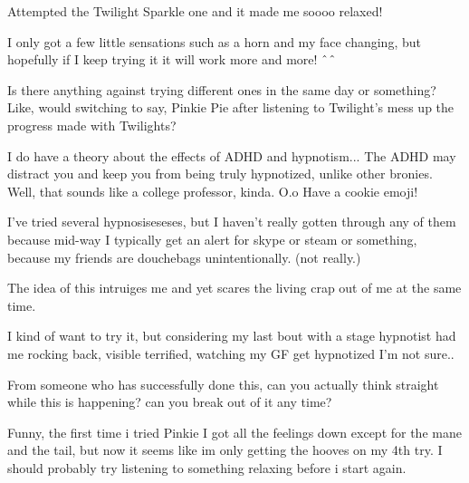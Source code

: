 \documentclass[ebook,12pt,oneside,openany]{memoir}
\newcommand{\carat}{$\char`\^$}
\begin{document}
\begin{tcolorbox}[title=Miss H]
\par{Attempted the Twilight Sparkle one and it made me soooo relaxed!}
\par{I only got a few little sensations such as a horn and my face changing, but hopefully if I keep trying it it will work more and more! \carat{}\carat{}}
\newline{}
\par{Is there anything against trying different ones in the same day or something? Like, would switching to say, Pinkie Pie after listening to Twilight's mess up the progress made with Twilights?}
\end{tcolorbox}
\begin{tcolorbox}[title=Scarletthealicorn,colback=lime!5!white,colframe=lime!75!black,coltitle=white]
\par{I do have a theory about the effects of ADHD and hypnotism... The ADHD may distract you and keep you from being truly hypnotized, unlike other bronies. Well, that sounds like a college professor, kinda. O.o   Have a cookie emoji!}
\end{tcolorbox}
\begin{tcolorbox}[title=Ron J]
\par{I've tried several hypnosiseseses, but I haven't really gotten through any of them because mid-way I typically get an alert for skype or steam or something, because my friends are douchebags unintentionally. (not really.)}
\end{tcolorbox}
\begin{tcolorbox}[title=Quiles]
\par{The idea of this intruiges me and yet scares the living crap out of me at the same time.}
\par{I kind of want to try it, but considering my last bout with a stage hypnotist had me rocking back, visible terrified, watching my GF get hypnotized I'm not sure..}
\newline{}
\par{From someone who has successfully done this, can you actually think straight while this is happening? can you break out of it any time?}
\end{tcolorbox}
\begin{tcolorbox}[title=Lord\_sm]
\par{Funny, the first time i tried Pinkie I got all the feelings down except for the mane and the tail, but now it seems like im only getting the hooves on my 4th try. I should probably try listening to something relaxing before i start again.}
\end{tcolorbox}
\end{document}
